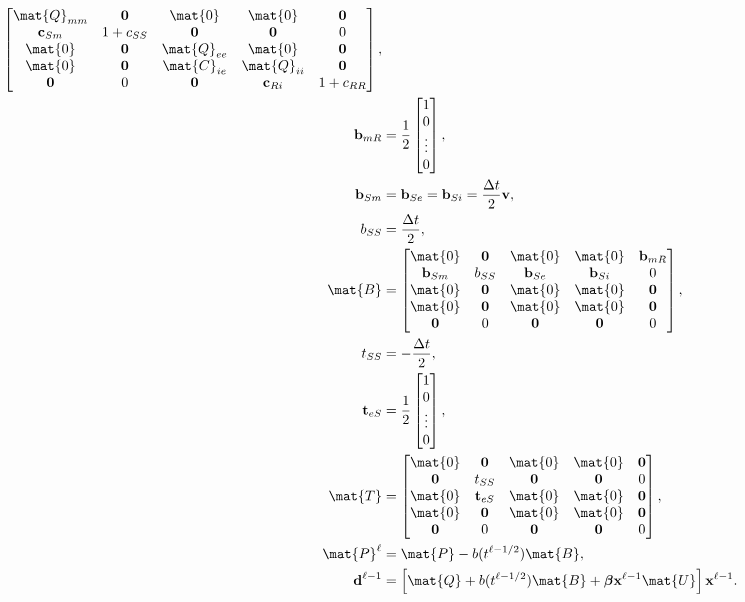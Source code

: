 \documentclass{jpmarticle}
\renewcommand{\vec}[1]{\boldsymbol{\mathrm{#1}}}
\let\subequationsorig\subequations%
\let\endsubequationsorig\endsubequations%
\renewenvironment{subequations}{
  \subequationsorig
  \renewcommand{\theequation}{\theparentequation.\arabic{equation}}
}{
  \endsubequationsorig
}
\begin{document}
\begin{subequations}
\begin{align}
\begin{bmatrix}
      \mat{Q}_{mm} & \vec{0} & \mat{0} & \mat{0} & \vec{0}
      \\
      \vec{c}_{Sm} & 1 + c_{SS} & \vec{0} & \vec{0} & 0
      \\
      \mat{0} & \vec{0} & \mat{Q}_{ee} & \mat{0} & \vec{0}
      \\
      \mat{0} & \vec{0} & \mat{C}_{ie} & \mat{Q}_{ii} & \vec{0}
      \\
      \vec{0} & 0 & \vec{0} & \vec{c}_{Ri} & 1 + c_{RR}
    \end{bmatrix},
    \\
    \vec{b}_{mR} &=
    \frac{1}{2}
    \begin{bmatrix}
      1 \\ 0 \\ \vdots \\ 0
    \end{bmatrix},
    \\
    \vec{b}_{Sm} &=
    \vec{b}_{Se} =
    \vec{b}_{Si} =
    \frac{\Delta t}{2} \vec{v},
    \\
    b_{SS} &=
    \frac{\Delta t}{2},
    \\
    \mat{B} &=
    \begin{bmatrix}
      \mat{0} & \vec{0} & \mat{0} & \mat{0} & \vec{b}_{mR}
      \\
      \vec{b}_{Sm} & b_{SS} & \vec{b}_{Se} & \vec{b}_{Si} & 0
      \\
      \mat{0} & \vec{0} & \mat{0} & \mat{0} & \vec{0}
      \\
      \mat{0} & \vec{0} & \mat{0} & \mat{0} & \vec{0}
      \\
      \vec{0} & 0 & \vec{0} & \vec{0} & 0
    \end{bmatrix},
    \\
    t_{SS} &=
    - \frac{\Delta t}{2},
    \\
    \vec{t}_{eS} &=
    \frac{1}{2}
    \begin{bmatrix}
      1 \\ 0 \\ \vdots \\ 0
    \end{bmatrix},
    \\
    \mat{T} &=
    \begin{bmatrix}
      \mat{0} & \vec{0} & \mat{0} & \mat{0} & \vec{0}
      \\
      \vec{0} & t_{SS} & \vec{0} & \vec{0} & 0
      \\
      \mat{0} & \vec{t}_{eS} & \mat{0} & \mat{0} & \vec{0}
      \\
      \mat{0} & \vec{0} & \mat{0} & \mat{0} & \vec{0}
      \\
      \vec{0} & 0 & \vec{0} & \vec{0} & 0
    \end{bmatrix},
    \\
    \mat{P}^{\ell} &=
    \mat{P} - b(t^{\ell - 1 / 2}) \mat{B},
    \\
    \vec{d}^{\ell - 1} &=
    \left[
      \mat{Q}
      + b(t^{\ell - 1 / 2}) \mat{B}
      + \vec{\beta} \vec{x}^{\ell - 1} \mat{U}
    \right] \vec{x}^{\ell - 1}.
  \end{align}
\end{subequations}
\end{document}
